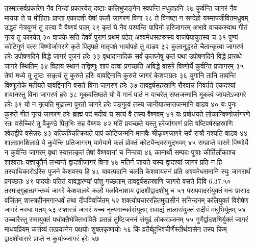 तस्मात्सर्वप्रकारेण नैव निन्दां प्रकारयेत् 
दष्टाः कलिभुजङ्गेन स्वपन्ति मधुहाहनि २७
कुर्वन्ति जागरं नैव मायया ते च मोहिताः 
प्राप्ता एकादशी येषां कलौ जागरणं विना २८
ते विनष्टा न सन्देहो यस्माज्जीवितमध्रुवम् 
उद्धृतं नेत्रयुग्मं तु दत्त्वा वै वैष्णवं पदम् २९
कृतं ये नैव पश्यन्ति पापिनो हरिजागरम् 
अभावे वाचकस्याथ गीतं नृत्यं तु कारयेत् ३०
वाचके सति देवर्षे पुराणं प्रथमं पठेत् 
अश्वमेधसहस्रस्य वाजपेयायुतस्य च ३१
पुण्यं कोटिगुणं वत्स विष्णोर्जागरणे कृते 
पितृपक्षे मातृपक्षे भार्यापक्षे तु वाडव ३२
कुलानुद्धरते चैतान्कृत्वा जागरणं हरेः 
उपोषणदिने विद्धे जागरं पूजनं हरेः ३३
वृथादानादिकं सर्वं कृतघ्नेषु कृतं यथा 
उपोषणदिने विद्धे प्रारब्धे जागरे स्थितिम् ३४
विहाय स्थानं तद्विष्णुः शापं दत्वा प्रगच्छति 
अविद्धे वासरे विष्णोर्ये कुर्वन्ति प्रजागरम् ३५
तेषां मध्ये तु तुष्टः सन्नृत्यं तु कुरुते हरिः 
यावद्दिनानि कुरुते जागरं केशवाग्रतः ३६
युगानि तानि तावन्ति विष्णुलोके महीयते 
यावद्दिनानि वसते विना जागरणं हरेः ३७
तावद्वर्षसहस्राणि रौरवान्न निवर्तते 
एकदश्यां शयानस्तु विना जागरणं हरेः ३८
मूकवत्तिष्ठते यो वै गानं पाठं न वाचरेत् 
सप्तजन्मानि मूकत्वं जायतेऽजागरे हरेः ३९
यो न नृत्यति मूढात्मा पुरतो जागरे हरेः 
पङ्गुत्वं तस्य जानीयात्सप्तजन्मानि वाडव ४०
यः पुनः कुरुते गीतं नृत्यं जागरणं हरेः 
ब्राह्मं पदं मदीयं च सत्यं वै तस्य वैष्णवम् ४१
यः प्रबोधयते लोकान्विष्णोर्जागरणे रतः 
वसेच्चिरं तु वैकुण्ठे पितृभिः सह वैष्णवः ४२
मतिं प्रयच्छते यस्तु हरेर्जागरणं प्रति 
षष्टिवर्षसहस्राणि श्वेतद्वीपे वसेन्नरः ४३
यत्किञ्चित्क्रियते पापं कोटिजन्मनि मानवैः 
श्रीकृष्णजागरे सर्वं रात्रौ नश्यति वाडव ४४
शालग्रामशिलाग्रे ये कुर्वन्ति प्रतिजागरम् 
यामेयामे फलं प्रोक्तं कोट्यैन्दवसमुद्भवम् ४५
सम्प्राप्ते वासरे विष्णोर्ये न कुर्वन्ति जागरम् 
वृथा स्यात्तत्कृतं तेषां वैष्णवानां च निन्दया ४६
कामार्थौ सम्पदः पुत्राः कीर्तिर्लोकाश्च शाश्वताः 
यज्ञायुतैर्न लभ्यन्ते द्वादशीजागरं विना ४७
मतिर्न जायते यस्य द्वादश्यां जागरं प्रति 
न हि तस्याधिकारोऽस्ति पूजने केशवस्य हि ४८
यावत्पदानि चलति केशवायतनं प्रति 
अश्वमेधसमानि स्युः जागरार्थं प्रगच्छतः ४९
पादयोः पतितं यावद्धरण्यां पांशु गच्छताम् 
तावद्वर्षसहस्राणि जागरो वसते दिवि 6.37.५०
तस्माद्गृहात्प्रगन्तव्यं जागरे केशवालये 
कलौ मलविनाशाय द्वादशीद्वादशीषु च ५१
परापवादसंयुक्तं मनः प्रासाद वर्जितम् 
शास्त्रहीनमगान्धर्वं तथा दीपविवर्जितम् ५२
शक्त्योपचाररहितमुदासीनं सनिन्दनम् 
कलियुक्तं विशेषेण जागरं नवधा मतम् ५३
सशास्त्रं जागरं यच्च नृत्यगान्धर्वसंयुतम् 
सवाद्यं तालासंयुक्तं सदीपं मधुभिर्युतम् ५४
उच्चारैस्तु समायुक्तं यथोक्तैर्भक्तिभावितैः 
प्रसन्नं तुष्टिजननं संमूढं लोकरञ्जनम् ५५
गुणैर्द्वादशभिर्युक्तं जागरं माधवप्रियम् 
कर्त्तव्यं तत्प्रयत्नेन पक्षयोः शुक्लकृष्णयोः ५६
किं व्रतैर्बहुभिश्चीर्णैस्तीर्थवासेन तस्य किम् 
द्वादशीवासरे प्राप्ते न कुर्याज्जागरं हरेः ५७
